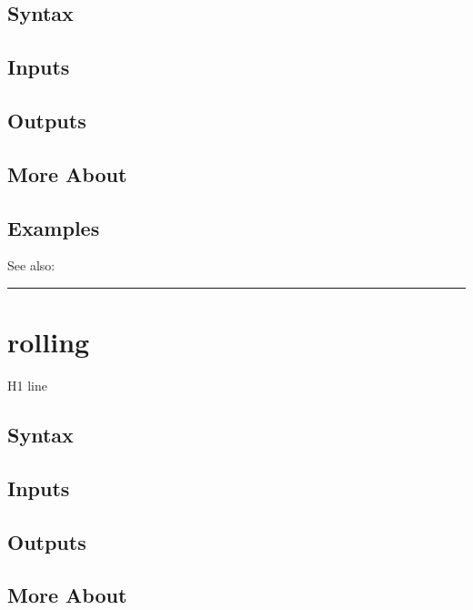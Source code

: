 \documentclass[letterpaper,10pt,english]{sphinxmanual}
\begin{document}
\subsection{Syntax}
\label{classes/time_series/@ts/ts:id494}

\subsection{Inputs}
\label{classes/time_series/@ts/ts:id495}

\subsection{Outputs}
\label{classes/time_series/@ts/ts:id496}

\subsection{More About}
\label{classes/time_series/@ts/ts:id497}

\subsection{Examples}
\label{classes/time_series/@ts/ts:id498}
See also:


\bigskip\hrule{}\bigskip



\section{rolling}
\label{classes/time_series/@ts/ts:rolling}\label{classes/time_series/@ts/ts:id499}
H1 line


\subsection{Syntax}
\label{classes/time_series/@ts/ts:id500}

\subsection{Inputs}
\label{classes/time_series/@ts/ts:id501}

\subsection{Outputs}
\label{classes/time_series/@ts/ts:id502}

\subsection{More About}
\label{classes/time_series/@ts/ts:id503}
\end{document}
